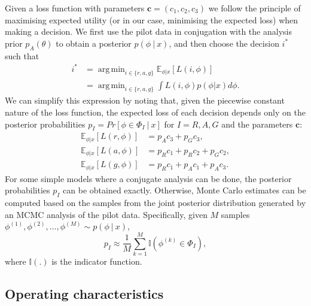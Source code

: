 \documentclass{article} %
\DeclareMathOperator*{\argmin}{arg\,min}
\begin{document}

Given a loss function with parameters $\mathbf{c} = (c_1, c_2, c_3)$ we follow the principle of maximising expected utility (or in our case, minimising the expected loss) when making a decision. We first use the pilot data in conjugation with the analysis prior $p_{A}(\theta)$ to obtain a posterior $p(\phi ~|~ x)$, and then choose the decision $i^{*}$ such that 
\begin{align}
i^{*} & = \argmin_{i \in \{r,a,g\}} \mathbb{E}_{\phi | x} [ L(i, \phi) ] \\
 & = \argmin_{i \in \{r,a,g\}} \int L(i, \phi) p(\phi | x) d\phi.
\end{align}
We can simplify this expression by noting that, given the piecewise constant nature of the loss function, the expected loss of each decision depends only on the posterior probabilities $p_{I} =  Pr[\phi \in \Phi_{I} ~|~ x]$ for $I = R, A, G$ and the parameters $\mathbf{c}$:
\begin{align}\label{eqn:exp_loss}
\mathbb{E}_{\phi | x} [ L(r, \phi) ] & = p_{A}c_{3} + p_{G}c_{3}, \\
\mathbb{E}_{\phi | x} [ L(a, \phi) ] & = p_{R}c_{1} + p_{R}c_{2} + p_{G}c_{2}, \\
\mathbb{E}_{\phi | x} [ L(g, \phi) ] & = p_{R}c_{1} + p_{A}c_{1} + p_{A}c_{3}.
\end{align}
For some simple models where a conjugate analysis can be done, the posterior probabilities $p_I$ can be obtained exactly. Otherwise, Monte Carlo estimates can be computed based on the samples from the joint posterior distribution generated by an MCMC analysis of the pilot data. Specifically, given $M$ samples $\phi^{(1)}, \phi^{(2)}, \ldots , \phi^{(M)} \sim p(\phi ~|~ x)$, 
\begin{equation}
p_I \approx \frac{1}{M} \sum_{k = 1}^{M}  \mathbb{I}(\phi^{(k)} \in \Phi_I),
\end{equation}
where $\mathbb{I}(.)$ is the indicator function.

\subsection{Operating characteristics}\label{sec:evaluation}
\end{document}
